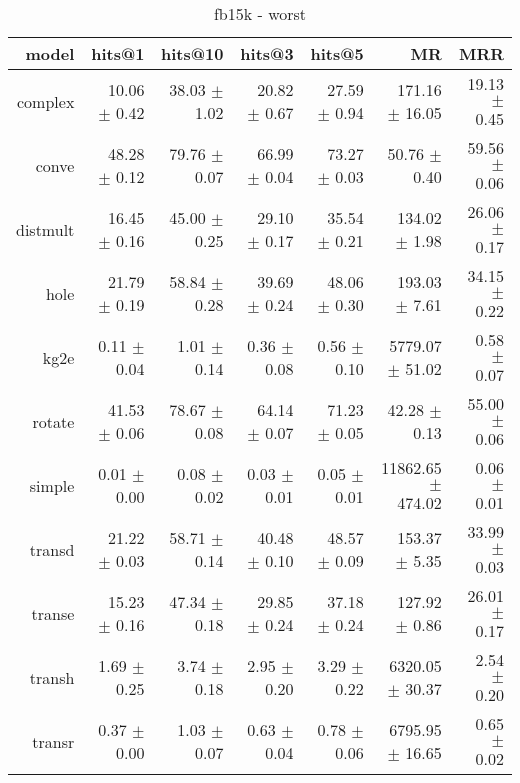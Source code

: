 \documentclass{article}
\begin{document}
    
    \begin{table}
\centering
\caption{fb15k - worst}
\begin{tabular}{rrrrrrr}
\toprule
    model &        hits@1 &       hits@10 &        hits@3 &        hits@5 &                 MR &           MRR \\
\midrule
  complex &  10.06 $\pm$ 0.42 &  38.03 $\pm$ 1.02 &  20.82 $\pm$ 0.67 &  27.59 $\pm$ 0.94 &     171.16 $\pm$ 16.05 &  19.13 $\pm$ 0.45 \\
    conve &  48.28 $\pm$ 0.12 &  79.76 $\pm$ 0.07 &  66.99 $\pm$ 0.04 &  73.27 $\pm$ 0.03 &       50.76 $\pm$ 0.40 &  59.56 $\pm$ 0.06 \\
 distmult &  16.45 $\pm$ 0.16 &  45.00 $\pm$ 0.25 &  29.10 $\pm$ 0.17 &  35.54 $\pm$ 0.21 &      134.02 $\pm$ 1.98 &  26.06 $\pm$ 0.17 \\
     hole &  21.79 $\pm$ 0.19 &  58.84 $\pm$ 0.28 &  39.69 $\pm$ 0.24 &  48.06 $\pm$ 0.30 &      193.03 $\pm$ 7.61 &  34.15 $\pm$ 0.22 \\
     kg2e &   0.11 $\pm$ 0.04 &   1.01 $\pm$ 0.14 &   0.36 $\pm$ 0.08 &   0.56 $\pm$ 0.10 &    5779.07 $\pm$ 51.02 &   0.58 $\pm$ 0.07 \\
   rotate &  41.53 $\pm$ 0.06 &  78.67 $\pm$ 0.08 &  64.14 $\pm$ 0.07 &  71.23 $\pm$ 0.05 &       42.28 $\pm$ 0.13 &  55.00 $\pm$ 0.06 \\
   simple &   0.01 $\pm$ 0.00 &   0.08 $\pm$ 0.02 &   0.03 $\pm$ 0.01 &   0.05 $\pm$ 0.01 &  11862.65 $\pm$ 474.02 &   0.06 $\pm$ 0.01 \\
   transd &  21.22 $\pm$ 0.03 &  58.71 $\pm$ 0.14 &  40.48 $\pm$ 0.10 &  48.57 $\pm$ 0.09 &      153.37 $\pm$ 5.35 &  33.99 $\pm$ 0.03 \\
   transe &  15.23 $\pm$ 0.16 &  47.34 $\pm$ 0.18 &  29.85 $\pm$ 0.24 &  37.18 $\pm$ 0.24 &      127.92 $\pm$ 0.86 &  26.01 $\pm$ 0.17 \\
   transh &   1.69 $\pm$ 0.25 &   3.74 $\pm$ 0.18 &   2.95 $\pm$ 0.20 &   3.29 $\pm$ 0.22 &    6320.05 $\pm$ 30.37 &   2.54 $\pm$ 0.20 \\
   transr &   0.37 $\pm$ 0.00 &   1.03 $\pm$ 0.07 &   0.63 $\pm$ 0.04 &   0.78 $\pm$ 0.06 &    6795.95 $\pm$ 16.65 &   0.65 $\pm$ 0.02 \\
\bottomrule
\end{tabular}
\end{table}

    
\end{document}
